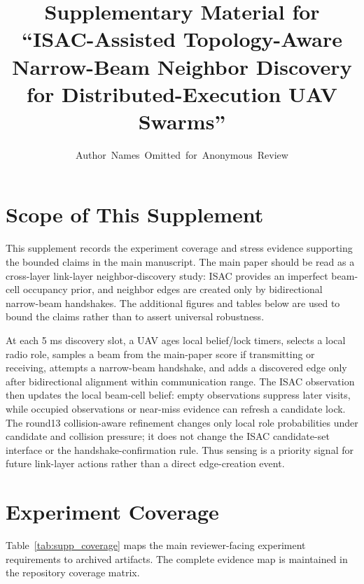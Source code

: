 \documentclass[journal]{IEEEtran}
\begin{document}
\title{Supplementary Material for ``ISAC-Assisted Topology-Aware Narrow-Beam Neighbor Discovery for Distributed-Execution UAV Swarms''}

\author{Author~Names~Omitted~for~Anonymous~Review}

\maketitle

\section{Scope of This Supplement}

This supplement records the experiment coverage and stress evidence supporting the bounded claims in the main manuscript.
The main paper should be read as a cross-layer link-layer neighbor-discovery study: ISAC provides an imperfect beam-cell occupancy prior, and neighbor edges are created only by bidirectional narrow-beam handshakes.
The additional figures and tables below are used to bound the claims rather than to assert universal robustness.

At each 5 ms discovery slot, a UAV ages local belief/lock timers, selects a local radio role, samples a beam from the main-paper score if transmitting or receiving, attempts a narrow-beam handshake, and adds a discovered edge only after bidirectional alignment within communication range.
The ISAC observation then updates the local beam-cell belief: empty observations suppress later visits, while occupied observations or near-miss evidence can refresh a candidate lock.
The round13 collision-aware refinement changes only local role probabilities under candidate and collision pressure; it does not change the ISAC candidate-set interface or the handshake-confirmation rule.
Thus sensing is a priority signal for future link-layer actions rather than a direct edge-creation event.

\section{Experiment Coverage}

Table~\ref{tab:supp_coverage} maps the main reviewer-facing experiment requirements to archived artifacts.
The complete evidence map is maintained in the repository coverage matrix.
\end{document}
